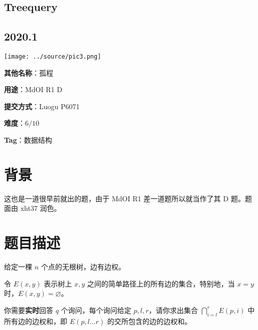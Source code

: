 \documentclass[a4paper,10pt]{article}
\begin{document}
\vspace*{\fill}
\begin{center}

\section{Treequery}

\subsection*{2020.1}

\vspace{10pt}

\texttt{[image: ../source/pic3.png]}

\vspace{10pt}

\textbf{其他名称}：孤程

\vspace{10pt}

\textbf{用途}：MdOI R1 D

\vspace{10pt}

\textbf{提交方式}：Luogu P6071

\vspace{10pt}

\textbf{难度}：$6/10$

\vspace{10pt}

\textbf{Tag}：数据结构

\end{center}
\vspace*{\fill}

\newpage

\section*{背景}

这也是一道很早前就出的题，由于 MdOI R1 差一道题所以就当作了其 D 题。题面由 xht37 润色。

\section*{题目描述}

给定一棵 $n$ 个点的无根树，边有边权。

令 $E(x,y)$ 表示树上 $x,y$ 之间的简单路径上的所有边的集合，特别地，当 $x=y$ 时，$E(x,y)=\varnothing$。

你需要\textbf{实时}回答 $q$ 个询问，每个询问给定 $p,l,r$，请你求出集合 $\bigcap_{i=l}^r E(p,i)$ 中所有边的边权和，即 $E(p, l\dots r)$ 的交所包含的边的边权和。
\end{document}
